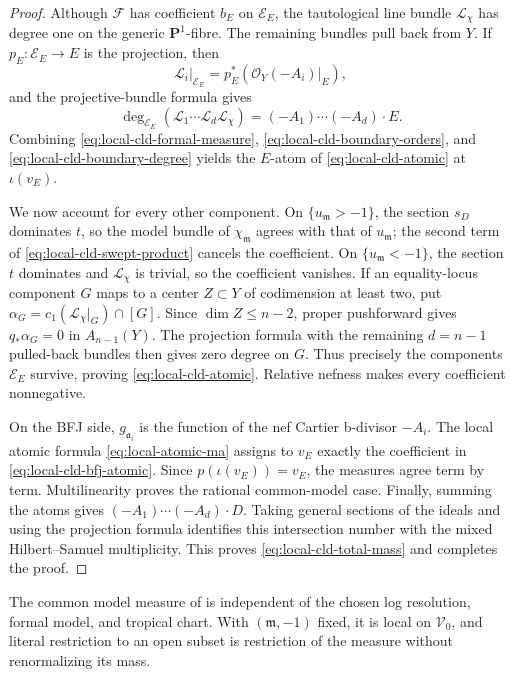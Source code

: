 \begin{proof}
Although \(\mathscr F\) has coefficient \(b_E\) on \(\mathscr E_E\), the
tautological line bundle \(\mathcal L_\chi\) has degree one on the generic
\(\mathbf P^1\)-fibre. The remaining bundles pull back from \(Y\). If
\(p_E:\mathscr E_E\to E\) is the projection, then
\[
 \mathcal L_i|_{\mathscr E_E}
    =p_E^*(\mathcal O_Y(-A_i)|_E),
\]
and the projective-bundle formula gives
\[
 \deg_{\mathscr E_E}
       (\mathcal L_1\cdots\mathcal L_d\mathcal L_\chi)
       =(-A_1)\cdots(-A_d)\cdot E.
\tag{70.48}\label{eq:local-cld-boundary-degree}
\]
Combining \eqref{eq:local-cld-formal-measure},
\eqref{eq:local-cld-boundary-orders}, and
\eqref{eq:local-cld-boundary-degree} yields the \(E\)-atom of
\eqref{eq:local-cld-atomic} at \(\iota(v_E)\).

We now account for every other component. On
\(\{u_{\mathfrak m}>-1\}\), the section \(s_D\) dominates \(t\), so the
model bundle of \(\chi_{\mathfrak m}\) agrees with that of
\(u_{\mathfrak m}\); the second term of
\eqref{eq:local-cld-swept-product} cancels the coefficient. On
\(\{u_{\mathfrak m}<-1\}\), the section \(t\) dominates and
\(\mathcal L_\chi\) is trivial, so the coefficient vanishes. If an
equality-locus component \(G\) maps to a center \(Z\subset Y\) of
codimension at least two, put
\(\alpha_G=c_1(\mathcal L_\chi|_G)\cap[G]\). Since
\(\dim Z\leq n-2\), proper pushforward gives \(q_*\alpha_G=0\) in
\(A_{n-1}(Y)\). The projection formula with the remaining \(d=n-1\)
pulled-back bundles then gives zero degree on \(G\). Thus precisely the
components \(\mathscr E_E\) survive, proving
\eqref{eq:local-cld-atomic}. Relative nefness makes every coefficient
nonnegative.

On the BFJ side, \(g_{\mathfrak a_i}\) is the function of the nef Cartier
b-divisor \(-A_i\). The local atomic formula
\eqref{eq:local-atomic-ma} assigns to \(v_E\) exactly the coefficient in
\eqref{eq:local-cld-bfj-atomic}. Since
\(p(\iota(v_E))=v_E\), the measures agree term by term. Multilinearity
proves the rational common-model case. Finally, summing the atoms gives
\((-A_1)\cdots(-A_d)\cdot D\). Taking general sections of the ideals and
using the projection formula identifies this intersection number with the
mixed Hilbert--Samuel multiplicity. This proves
\eqref{eq:local-cld-total-mass} and completes the proof.
\end{proof}

\begin{proposition}\label{prop:local-cld-independence}
The common model measure of
 is independent of the chosen log
resolution, formal model, and tropical chart. With
\((\mathfrak m,-1)\) fixed, it is local on \(\mathcal V_0\), and literal
restriction to an open subset is restriction of the measure without
renormalizing its mass.
\end{proposition}

